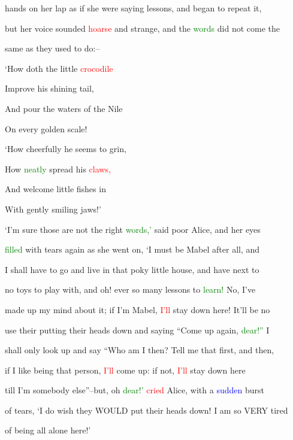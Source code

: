 hands on her lap as if she were saying \textcolor{BurntOrange}{lessons,} and began to repeat it,

 but her voice sounded \textcolor{red}{hoarse} and strange, and the \textcolor{green}{words} did not come the

 same as they used to do:--



 ‘How doth the little \textcolor{red}{crocodile}

 \textcolor{BurntOrange}{Improve} his shining tail,

 And pour the waters of the Nile

 On every golden scale!



 ‘How cheerfully he seems to \textcolor{BurntOrange}{grin,}

 How \textcolor{green}{neatly} spread his \textcolor{red}{claws,}

 And welcome little fishes in

 With gently \textcolor{BurntOrange}{smiling} jaws!’



 ‘I’m sure those are not the right \textcolor{green}{words,’} said poor Alice, and her eyes

 \textcolor{green}{filled} with tears again as she went on, ‘I must be Mabel after all, and

 I shall have to go and live in that poky little house, and have next to

 no toys to play with, and oh! ever so many \textcolor{BurntOrange}{lessons} to \textcolor{green}{learn!} No, I’ve

 made up my mind about it; if I’m Mabel, \textcolor{red}{I’ll} stay down here! It’ll be no

 use their putting their heads down and saying “Come up again, \textcolor{green}{dear!”} I

 shall only look up and say “Who am I then? Tell me that first, and then,

 if I like being that person, \textcolor{red}{I’ll} come up: if not, \textcolor{red}{I’ll} stay down here

 till I’m somebody else”--but, oh \textcolor{green}{dear!’} \textcolor{red}{cried} Alice, with a \textcolor{blue}{sudden} burst

 of tears, ‘I do wish they WOULD put their heads down! I am so VERY tired

 of being all alone here!’



